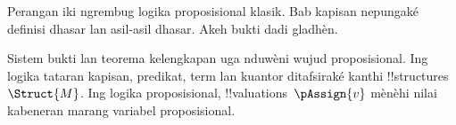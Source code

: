 \documentclass[../../include/open-logic-part]{subfiles}
\begin{document}

Perangan iki ngrembug logika proposisional klasik. Bab kapisan nepungaké definisi dhasar
lan asil-asil dhasar. Akeh bukti dadi gladhèn.

Sistem bukti lan teorema kelengkapan uga nduwèni wujud proposisional.
Ing logika tataran kapisan, predikat, term lan kuantor
ditafsiraké kanthi !!{structure}s~$\Struct{M}$.
Ing logika proposisional, !!{valuation}s~$\pAssign{v}$
mènèhi nilai kabeneran marang variabel proposisional.










\OLEndPartHook
\end{document}
